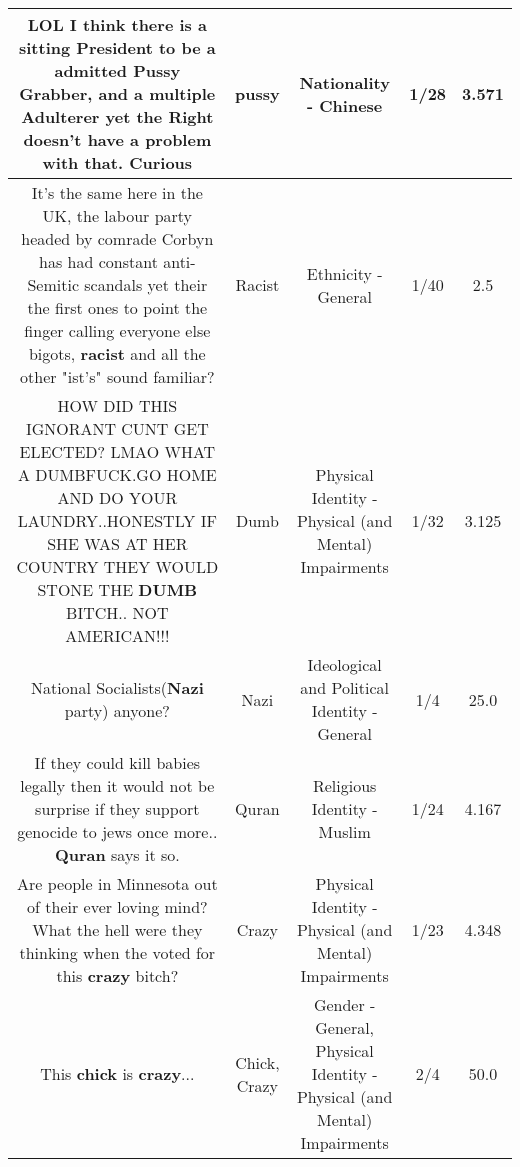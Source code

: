 \documentclass[11pt]{article}
\newlength\mylength
\begin{document}
\begin{center}
\begin{longtable}{|C{.65\mylength}|C{.30\mylength}|C{.12\mylength}|C{.12\mylength}|C{.12\mylength}|}
  \small LOL I think there is a sitting President to be a admitted \textbf{Pussy} Grabber, and a multiple Adulterer yet the Right doesn't have a problem with that. Curious\normalsize   & pussy & Nationality - Chinese & 1/28 & 3.571 \\  \hline
  \small It's the same here in the UK, the labour party headed by comrade Corbyn has had constant anti-Semitic scandals yet their the first ones to point the finger calling everyone else bigots, \textbf{racist} and all the other "ist's" sound familiar?\normalsize   & Racist & Ethnicity - General & 1/40 & 2.5 \\  \hline
  \small HOW DID THIS IGNORANT CUNT GET ELECTED? LMAO WHAT A DUMBFUCK.GO HOME AND DO YOUR LAUNDRY..HONESTLY IF SHE WAS AT HER COUNTRY THEY WOULD STONE THE \textbf{DUMB} BITCH.. NOT  AMERICAN!!!\normalsize   & Dumb & Physical Identity - Physical (and Mental) Impairments & 1/32 & 3.125 \\  \hline
  \small National Socialists(\textbf{Nazi} party) anyone?\normalsize   & Nazi &  Ideological and Political Identity - General & 1/4 & 25.0 \\  \hline
  \small If they could kill babies legally then it would not be surprise if they support genocide to jews once more.. \textbf{Quran} says it so.\normalsize   & Quran & Religious Identity - Muslim & 1/24 & 4.167 \\  \hline
  \small Are people in Minnesota out of their ever loving mind? What the hell were they thinking when the voted for this \textbf{crazy} bitch?\normalsize   & Crazy & Physical Identity - Physical (and Mental) Impairments & 1/23 & 4.348 \\  \hline
  \small This \textbf{chick} is \textbf{crazy}...\normalsize   & Chick, Crazy & Gender - General, Physical Identity - Physical (and Mental) Impairments & 2/4 & 50.0 \\  \hline

\end{longtable}
\end{center}
\end{document}
